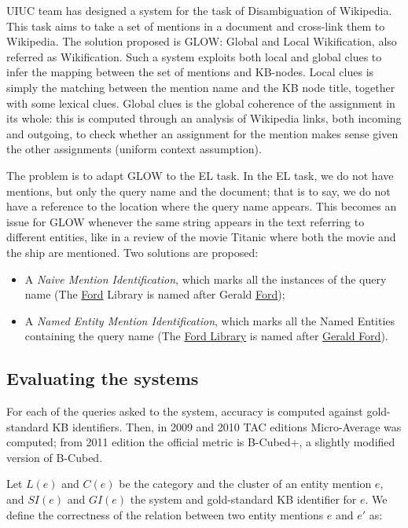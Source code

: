 \documentclass[a4paper,11pt]{report}
\begin{document}
UIUC team has designed a system for the task of Disambiguation of Wikipedia. This task aims to take a set of mentions in a document and cross-link them to Wikipedia. The solution proposed is GLOW: Global and Local Wikification, also referred as Wikification. Such a system exploits both local and global clues to infer the mapping between the set of mentions and KB-nodes. Local clues is simply the matching between the mention name and the KB node title, together with some lexical clues. Global clues is the global coherence of the assignment in its whole: this is computed through an analysis of Wikipedia links, both incoming and outgoing, to check whether an assignment for the mention makes sense given the other assignments (uniform context assumption).

The problem is to adapt GLOW to the EL task. In the EL task, we do not have mentions, but only the query name and the document; that is to say, we do not have a reference to the location where the query name appears. This becomes an issue for GLOW whenever the same string appears in the text referring to different entities, like in a review of the movie Titanic where both the movie and the ship are mentioned. Two solutions are proposed:
\begin{itemize}
\item A \emph{Naive Mention Identification}, which marks all the instances of the query name
(The \underline{Ford} Library is named after Gerald \underline{Ford});

\item A \emph{Named Entity Mention Identification}, which marks all the Named Entities containing the query name
(The \underline{Ford Library} is named after \underline{Gerald Ford}).
\end{itemize}

\subsection{Evaluating the systems}
For each of the queries asked to the system, accuracy is computed against gold-standard KB identifiers. Then, in 2009 and 2010 TAC editions Micro-Average was computed; from 2011 edition the official metric is B-Cubed+, a slightly modified version of B-Cubed.

Let $L(e)$ and $C(e)$ be the category and the cluster of an entity mention $e$, and $SI(e)$ and $GI(e)$ the system and gold-standard KB identifier for $e$. We define the correctness of the relation between two entity mentions $e$ and $e'$ as:
\end{document}
